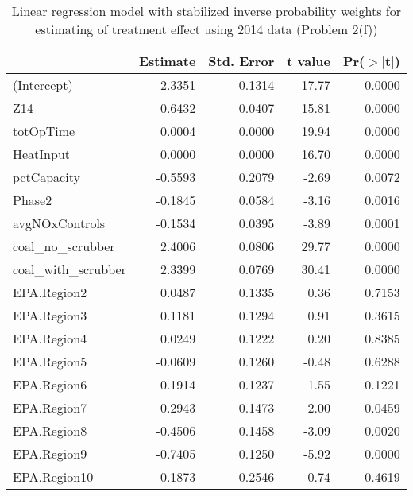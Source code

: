 \begin{table}[ht]
\centering
\begin{tabular}{lrrrr}
  \toprule
 & Estimate & Std. Error & t value & Pr($>$$|$t$|$) \\ 
  \midrule
(Intercept) & 2.3351 & 0.1314 & 17.77 & 0.0000 \\ 
  Z14 & -0.6432 & 0.0407 & -15.81 & 0.0000 \\ 
  totOpTime & 0.0004 & 0.0000 & 19.94 & 0.0000 \\ 
  HeatInput & 0.0000 & 0.0000 & 16.70 & 0.0000 \\ 
  pctCapacity & -0.5593 & 0.2079 & -2.69 & 0.0072 \\ 
  Phase2 & -0.1845 & 0.0584 & -3.16 & 0.0016 \\ 
  avgNOxControls & -0.1534 & 0.0395 & -3.89 & 0.0001 \\ 
  coal\_no\_scrubber & 2.4006 & 0.0806 & 29.77 & 0.0000 \\ 
  coal\_with\_scrubber & 2.3399 & 0.0769 & 30.41 & 0.0000 \\ 
  EPA.Region2 & 0.0487 & 0.1335 & 0.36 & 0.7153 \\ 
  EPA.Region3 & 0.1181 & 0.1294 & 0.91 & 0.3615 \\ 
  EPA.Region4 & 0.0249 & 0.1222 & 0.20 & 0.8385 \\ 
  EPA.Region5 & -0.0609 & 0.1260 & -0.48 & 0.6288 \\ 
  EPA.Region6 & 0.1914 & 0.1237 & 1.55 & 0.1221 \\ 
  EPA.Region7 & 0.2943 & 0.1473 & 2.00 & 0.0459 \\ 
  EPA.Region8 & -0.4506 & 0.1458 & -3.09 & 0.0020 \\ 
  EPA.Region9 & -0.7405 & 0.1250 & -5.92 & 0.0000 \\ 
  EPA.Region10 & -0.1873 & 0.2546 & -0.74 & 0.4619 \\ 
   \bottomrule
\end{tabular}
\caption{Linear regression model with stabilized inverse probability weights for estimating of treatment effect using 2014 data (Problem 2(f))} 
\label{tab:lm-2f-14}
\end{table}


